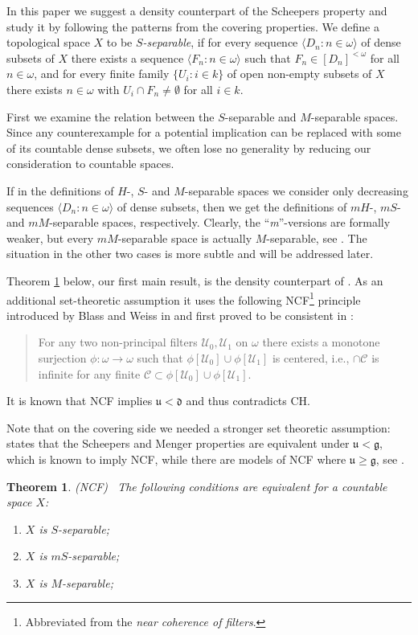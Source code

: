 \documentclass[12pt,a4paper]{amsart}
\newtheorem{theorem}{Theorem}[section]
\theoremstyle{definition}
\newcommand{\U}{\mathcal U}
\newcommand{\w}{\omega}
\newcommand{\la}{\langle}
\newcommand{\ra}{\rangle}
\newcommand{\hot}{\mathfrak}
\begin{document}
In this paper we suggest a density counterpart of the Scheepers property
and study it by following the patterns from the covering properties. We define a  topological space $X$  to be \emph{$S$-separable}, if for every 
sequence $\la D_n:n\in\w\ra$ of dense subsets of $X$ there exists a sequence
$\la F_n:n\in\w\ra$  such that $F_n\in [D_n]^{<\w}$ for all $n\in\w$,
and for every finite family $\{U_i:i\in k\}$ of open non-empty subsets of
$X$ there exists $n\in\w$ with $U_i\cap F_n\neq\emptyset$ for all $i\in k$.

 First we examine the relation between the $S$-separable and $M$-separable spaces. Since any counterexample for a potential implication can be replaced
 with some of its countable dense subsets, 
 we often {lose} no generality  by reducing our  consideration to countable spaces. 

 If in the definitions of $H$-, $S$- and  $M$-separable spaces we consider only decreasing sequences $\la D_n:n\in\w\ra$ of dense subsets, then we get the definitions of  $mH$-, $mS$-  and $mM$-separable spaces, respectively. Clearly, the ``\emph{m}''-versions are formally weaker, but every $mM$-separable space is actually
 $M$-separable, see \cite{GruSak11}. The situation in the other two cases is more subtle and will be addressed later.

Theorem \ref{main_ncf} below, our first main result,
 is the density counterpart of 
\cite[Corollary~2]{Zdo05}.
As an additional set-theoretic assumption
it uses the following  NCF\footnote{Abbreviated from the \emph{near coherence of filters}.}
principle  introduced by Blass and Weiss in \cite{BlaWei78} and first proved to be consistent in 
\cite{BlaShe87}: 
\begin{quote} For any two non-principal filters $\U_0,\U_1$ on $\w$ there exists a monotone surjection $\phi:\w\to\w$ such that $\phi[\U_0]\cup\phi[\U_1]$ is centered, i.e., $\cap\mathcal C$ is infinite for any finite $\mathcal C\subset \phi[\U_0]\cup\phi[\U_1]$.
\end{quote}
It is known \cite[Theorem~14]{Bla86} that  NCF implies $\hot u<\hot d$ and thus contradicts CH. 

Note that on the covering side we needed a stronger set theoretic assumption:
\cite[Corollary~2]{Zdo05} states that the Scheepers and Menger properties are equivalent
under $\hot u<\hot g$, which is known \cite{BlaLaf89} to imply NCF, while there are models of NCF where $\hot u\geq \hot g$, see \cite{MilShe11}.

\begin{theorem} \label{main_ncf}
(NCF) \ The following conditions are equivalent for 
a countable space $X$:
\begin{enumerate}
\item $X$ is $S$-separable;
\item $X$ is $mS$-separable;
\item $X$ is $M$-separable;
\end{enumerate}
\end{theorem}
\end{document}

